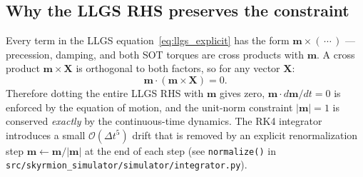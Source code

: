 \documentclass[11pt,a4paper]{article}
\newcommand{\mb}[1]{\mathbf{#1}}
\begin{document}
\subsection*{Why the LLGS RHS preserves the constraint}

Every term in the LLGS equation~\eqref{eq:llgs_explicit} has the form
$\mb{m}\times(\,\cdots\,)$ --- precession, damping, and both SOT
torques are cross products with $\mb{m}$. A cross product
$\mb{m}\times\mb{X}$ is orthogonal to both factors, so for any vector
$\mb{X}$:
%
\begin{equation}
\mb{m}\cdot(\mb{m}\times\mb{X}) = 0.
\end{equation}
%
Therefore dotting the entire LLGS RHS with $\mb{m}$ gives zero,
$\mb{m}\cdot d\mb{m}/dt = 0$ is enforced by the equation of motion,
and the unit-norm constraint $|\mb{m}|=1$ is conserved
\emph{exactly} by the continuous-time dynamics. The RK4 integrator
introduces a small $\mathcal{O}(\Delta t^5)$ drift that is removed
by an explicit renormalization step
$\mb{m} \leftarrow \mb{m}/|\mb{m}|$ at the end of each step (see
\texttt{normalize()} in \texttt{src/skyrmion\_simulator/simulator/integrator.py}).
\end{document}
